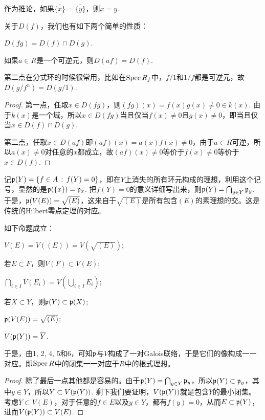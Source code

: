 作为推论，如果$\overline{\{x\}}=\overline{\{y\}}$，则$x=y$.

\begin{pro}
关于$D(f)$，我们也有如下两个简单的性质：
\begin{compactenum}[~~~1.]
\item $D(fg)=D(f)\cap D(g)$.
\item 如果$a\in R$是一个可逆元，则$D(af)=D(f)$.
\end{compactenum}
\end{pro}

第二点在分式环的时候很常用，比如在$\operatorname{Spec} R_f$中，$f/1$和$1/f$都是可逆元，故$D(g/f^n)=D(g/1)$.

\begin{proof}
第一点，任取$x\in D(fg)$，则$(fg)(x)=f(x)g(x)\neq 0\in k(x)$. 由于$k(x)$是一个域，所以$x\in D(fg)$当且仅当$f(x)\neq 0$且$g(x)\neq 0$，即当且仅当$x\in D(f)\cap D(g)$.

第二点，任取$x\in D(af)$即$(af)(x)=a(x)f(x)\neq 0$，由于$a\in R$可逆，所以$a(x)\neq 0$对任意的$x$都成立，故$(af)(x)\neq 0$等价于$f(x)\neq 0$等价于$x\in D(f)$.
\end{proof}

记$\mathfrak{p}(Y)=\{f\in A\,:\, f(Y)=0\}$，即在$Y$上消失的所有环元构成的理想，利用这个记号，显然的是$\mathfrak{p}(\{x\})=\mathfrak{p}_x$. 把$f(Y)=0$的意义详细写出来，则$\mathfrak{p}(Y)=\bigcap_{y\in Y}\mathfrak{p}_y$. 于是，$\mathfrak{p}(V(E))=\sqrt{(E)}$，这来自于$\sqrt{(E)}$是所有包含$(E)$的素理想的交。这是传统的Hilbert零点定理的对应。

\begin{pro}如下命题成立：
\begin{compactenum}[~~~1.]
\item $V(E)=V((E))=V(\sqrt{(E)})$;
\item 若$E\subset F$，则$V(F)\subset V(E)$;
\item $\bigcap_{i\in I}V(E_i)=V(\bigcup_{i\in I}E_i)$;
\item 若$X\subset Y$，则$\mathfrak{p}(Y) \subset \mathfrak{p}(X)$;
\item $\mathfrak{p}(V(E))=\sqrt{(E)}$;
\item $V(\mathfrak{p}(Y))=\overline{Y}$.
\end{compactenum}
\end{pro}

于是，由1, 2, 4, 5和6，可知$\mathfrak{p}$与$V$构成了一对Galois联络，于是它们的像构成一一对应。即$\operatorname{Spec} R$中的闭集一一对应于$R$中的根式理想。

\begin{proof}

除了最后一点其他都是容易的。由于$\mathfrak{p}(Y)=\bigcap_{y\in Y}\mathfrak{p}_y$，所以$\mathfrak{p}(Y) \subset \mathfrak{p}_y$，其中$y\in Y$，所以$Y\subset V(\mathfrak{p}(Y))$. 剩下我们要证明，$V(\mathfrak{p}(Y))$就是包含$Y$的最小闭集。考虑$Y\subset V(E)$，对于任意的$f\in E$以及$y\in Y$，都有$f(y)=0$，从而$E\subset \mathfrak{p}(Y)$，进而$V(\mathfrak{p}(Y))\subset V(E)$. 
\end{proof}

